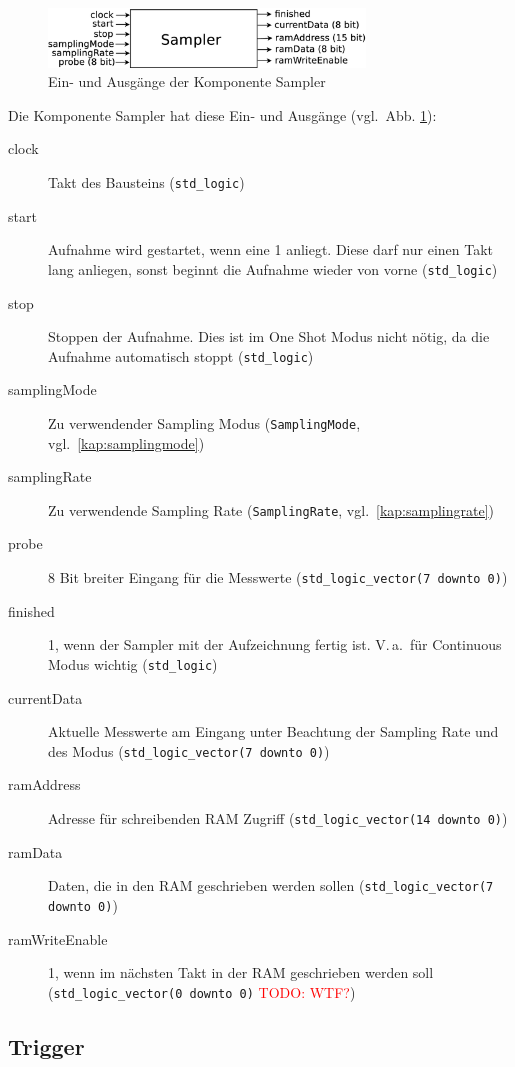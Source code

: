 \documentclass[IN,ngerman,utf8,12pt]{tumbook}
\newcommand\todo[1]{\textcolor{red}{TODO: #1}}
\newcommand{\vgl}{vgl.\ }
\newcommand{\Va}{V.\,a.\ }
\begin{document}
\begin{figure}[H]
    \centerline{
        \includegraphics[width=0.75\textwidth]{img/sampler}
    }
    \label{abb:sampler}
    \caption{Ein- und Ausgänge der Komponente Sampler}
\end{figure}

Die Komponente Sampler hat diese Ein- und Ausgänge (\vgl Abb. \ref{abb:sampler}):
\begin{description}
    \item[clock] Takt des Bausteins (\texttt{std\_logic})
    \item[start] Aufnahme wird gestartet, wenn eine 1 anliegt. Diese darf nur einen Takt lang anliegen, sonst beginnt die Aufnahme wieder von vorne (\texttt{std\_logic})
    \item[stop] Stoppen der Aufnahme. Dies ist im One Shot Modus nicht nötig, da die Aufnahme automatisch stoppt (\texttt{std\_logic})
    \item[samplingMode] Zu verwendender Sampling Modus (\texttt{SamplingMode}, \vgl \ref{kap:samplingmode})
    \item[samplingRate] Zu verwendende Sampling Rate (\texttt{SamplingRate}, \vgl \ref{kap:samplingrate})
    \item[probe] 8 Bit breiter Eingang für die Messwerte (\texttt{std\_logic\_vector(7 downto 0)})
    \item[finished] 1, wenn der Sampler mit der Aufzeichnung fertig ist. \Va für Continuous Modus wichtig (\texttt{std\_logic})
    \item[currentData] Aktuelle Messwerte am Eingang unter Beachtung der Sampling Rate und des Modus (\texttt{std\_logic\_vector(7 downto 0)})
    \item[ramAddress] Adresse für schreibenden RAM Zugriff (\texttt{std\_logic\_vector(14 downto 0)})
    \item[ramData] Daten, die in den RAM geschrieben werden sollen (\texttt{std\_logic\_vector(7 downto 0)})
    \item[ramWriteEnable] 1, wenn im nächsten Takt in der RAM geschrieben werden soll (\texttt{std\_logic\_vector(0 downto 0)} \todo{WTF?})
\end{description}

\subsection{Trigger}
\end{document}
